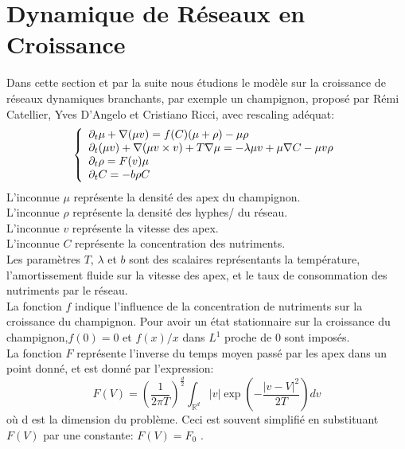 \documentclass[11pt]{article}
\begin{document}
\fi

\section{Dynamique de Réseaux en Croissance}
Dans cette section et par la suite nous étudions le modèle sur la croissance de réseaux dynamiques branchants, par exemple un champignon, proposé par Rémi Catellier, Yves D'Angelo et Cristiano Ricci, avec rescaling adéquat:
\begin{equation}\label{eq:BDNG}  \left\{
                \begin{array}{ll}
                \partial_t\mu + \nabla(\mu v) = f(C)(\mu + \rho) -\mu\rho \\
                   \partial_t(\mu v)+\nabla(\mu v\times v) +T\nabla\mu=-\lambda\mu v+\mu\nabla C-\mu v \rho \\
                 \partial_t\rho=  F(v) \mu \\
                  \partial_t C = -b\rho C
                \end{array}
              \right.
\end{equation} 
L'inconnue $\mu$ représente la densité des apex du champignon.\\
L'inconnue $\rho$ représente la densité des hyphes/ du réseau.\\
L'inconnue $v$ représente la vitesse des apex.\\
L'inconnue $C$ représente la concentration des nutriments.\\
Les paramètres $T$, $\lambda$ et $b$ sont des scalaires représentants la température, l'amortissement fluide sur la vitesse des apex, et le taux de consommation des nutriments par le réseau.\\
La fonction $f$ indique l'influence de la concentration de nutriments sur la croissance du champignon. Pour avoir un état stationnaire sur la croissance du champignon,$f(0)=0$ et $f(x)/x$ dans $L^1$ proche de 0 sont imposés.\\
La fonction $F$ représente l'inverse du temps moyen passé par les apex dans un point donné, et est donné par l'expression:
\begin{equation}
	F(V)=(\frac{1}{2\pi T})^\frac{d}{2}\int_{\mathbb{R}^d} |v|\exp(-\frac{|v-V|^2}{2T})dv\end{equation}
où d est la dimension du problème. Ceci est souvent simplifié en substituant $F(V)$ par une constante: $F(V)= F_0$ .\\
\end{document}
